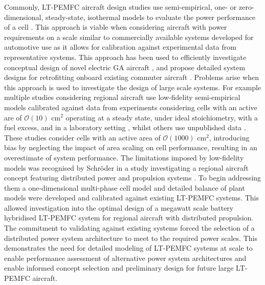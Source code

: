Commonly, LT-PEMFC aircraft design studies use semi-empirical, one- or zero-dimensional, steady-state, isothermal  models to evaluate the power performance of a cell \cite{nicolayConceptualDesignOptimization2021b,  abukasimPerformanceFailureAnalysis2022a, ngHydrogenFuelCells2019a, parkRefinedSizingMethod2022, chiaramassaroOptimalDesignHydrogenpowered2024a, schmelcherHydrogenFuelCells2022a, sparanoFutureTechnologicalPotential2023a}.
This approach is viable when considering aircraft with  power requirements on a scale similar to commercially available systems developed for automotive use as it allows for calibration against experimental data from representative systems.
This approach has been used to efficiently investigate conceptual design of novel electric GA aircraft \cite{nicolayConceptualDesignOptimization2021b}, and propose detailed system designs for retrofitting onboard existing commuter aircraft \cite{abukasimPerformanceFailureAnalysis2022a}.
Problems arise when this approach is used to investigate the design of large scale systems.
For example multiple studies considering regional aircraft use low-fidelity semi-empirical models calibrated against data from experiments considering cells with an active are of $\mathcal{O}(10)$ cm$^2$ operating at a steady state, under ideal stoichiometry, with a fuel excess, and in a laboratory setting \cite{chiaramassaroOptimalDesignHydrogenpowered2024a, schmelcherHydrogenFuelCells2022a}, whilst others use unpublished data \cite{sparanoFutureTechnologicalPotential2023a}.
These studies consider cells with an active area of $\mathcal{O}(1000)$ cm$^2$, introducing bias by neglecting the impact of area scaling on cell performance, resulting in an overestimate of system performance.
The limitations imposed by low-fidelity models was recognised by Schr\"oder \etal in a study investigating a regional aircraft concept featuring distributed power and propulsion systems \cite{schroderOptimalDesignProton2024}.
To begin addressing them a one-dimensional multi-phase cell model and detailed balance of plant models were developed and calibrated against existing LT-PEMFC systems.
This allowed investigation into the optimal design of a megawatt scale battery hybridised LT-PEMFC system for regional aircraft with distributed propulsion.
The commitment to validating against existing systems forced the selection of a distributed power system architecture to meet to the required power scales.
This demonstrates the need for detailed modeling of LT-PEMFC systems at scale to enable performance assessment of alternative power system architectures and enable informed concept selection and preliminary design for future large LT-PEMFC aircraft.
